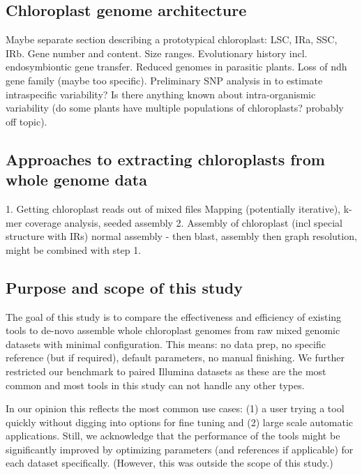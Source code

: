 \documentclass{bmcart}
\begin{document}
\subsection*{Chloroplast genome architecture}
Maybe separate section describing a prototypical chloroplast: LSC, IRa, SSC, IRb. Gene number and content. Size ranges. Evolutionary history incl. endosymbiontic gene transfer. Reduced genomes in parasitic plants. Loss of ndh gene family (maybe too specific). Preliminary SNP analysis in  to estimate intraspecific variability? Is there anything known about intra-organismic variability (do some plants have multiple populations of chloroplasts? probably off topic).

\subsection*{Approaches to extracting chloroplasts from whole genome data}
1. Getting chloroplast reads out of mixed files
Mapping (potentially iterative), k-mer coverage analysis, seeded assembly
2. Assembly of chloroplast (incl special structure with IRs)
normal assembly - then blast, assembly then graph resolution, might be combined with step 1.
\cite{twyford_strategies_2017}

\subsection*{Purpose and scope of this study}
The goal of this study is to compare the effectiveness and efficiency of existing tools to de-novo assemble whole chloroplast genomes from raw mixed genomic datasets with minimal configuration.
This means: no data prep, no specific reference (but  if required), default parameters, no manual finishing.
We further restricted our benchmark to paired Illumina datasets as these are the most common  and most  tools in this study can not handle any other types.

In our opinion this reflects the most common use cases: (1) a user trying a tool quickly without digging into options for fine tuning and (2) large scale automatic applications.
Still, we acknowledge that the performance of the tools might be significantly improved by optimizing parameters (and references if applicable) for each dataset specifically.
(However, this was outside the scope of this study.)

\end{document}

